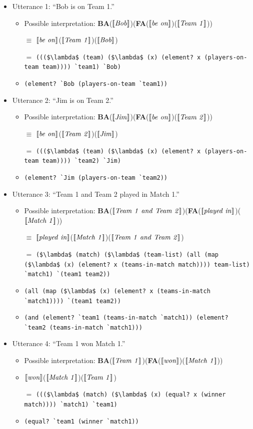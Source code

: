 \documentclass[pdfextras]{handbook}
\newcommand{\llbracket}{\ensuremath{\left [\!\left [}}%
\newcommand{\rrbracket}{\ensuremath{\right ]\!\right ]}}
\providecommand{\sv}[1]{\ensuremath{\llbracket \mathit{#1} \rrbracket}}
\begin{document}
\begin{itemize}
\item Utterance 1: ``Bob is on Team 1.''
\begin{itemize}
\item Possible interpretation: \textbf{BA}(\sv{Bob})(\textbf{FA}(\sv{be\ on})(\sv{Team\ 1}))
\item [$\equiv$] \sv{be\ on}(\sv{Team\ 1})(\sv{Bob})
\item [$=$] \lstinline[mathescape]{((($\lambda$ (team) ($\lambda$ (x) (element? x (players-on-team team)))) `team1) `Bob)}
\item [$\equiv$] \lstinline{(element? `Bob (players-on-team `team1))}
\end{itemize}
\item Utterance 2: ``Jim is on Team 2.''
\begin{itemize}
\item Possible interpretation: \textbf{BA}(\sv{Jim})(\textbf{FA}(\sv{be\ on})(\sv{Team\ 2}))
\item [$\equiv$] \sv{be\ on}(\sv{Team\ 2})(\sv{Jim})
\item [$=$] \lstinline[mathescape]{((($\lambda$ (team) ($\lambda$ (x) (element? x (players-on-team team)))) `team2) `Jim)}
\item [$\equiv$] \lstinline{(element? `Jim (players-on-team `team2))}
\end{itemize}
\item Utterance 3: ``Team 1 and Team 2 played in Match 1.''
\begin{itemize}
\item Possible interpretation: \textbf{BA}(\sv{Team\ 1\ and\ Team\ 2})(\textbf{FA}(\sv{played\ in})(\sv{Match\ 1}))
\item [$\equiv$] \sv{played\ in}(\sv{Match\ 1})(\sv{Team\ 1\ and\ Team\ 2})
\item [$=$] \lstinline[mathescape]{($\lambda$ (match) ($\lambda$ (team-list) (all (map ($\lambda$ (x) (element? x (teams-in-match match)))) team-list) `match1) `(team1 team2))} 
\item [$\equiv$] \lstinline[mathescape]{(all (map ($\lambda$ (x) (element? x (teams-in-match `match1)))) `(team1 team2))}   
\item [$\equiv$] \lstinline[mathescape]{(and (element? `team1 (teams-in-match `match1)) (element? `team2 (teams-in-match `match1)))}  
\end{itemize}
\item Utterance 4: ``Team 1 won Match 1.''
\begin{itemize}
\item Possible interpretation: \textbf{BA}(\sv{Team\ 1})(\textbf{FA}(\sv{won})(\sv{Match\ 1}))
\item [$\equiv$] \sv{won}(\sv{Match\ 1})(\sv{Team\ 1})
\item [$=$] \lstinline[mathescape]{((($\lambda$ (match) ($\lambda$ (x) (equal? x (winner match)))) `match1) `team1)}
\item [$\equiv$] \lstinline{(equal? `team1 (winner `match1))}
\end{itemize}
\end{itemize}
\end{document}
